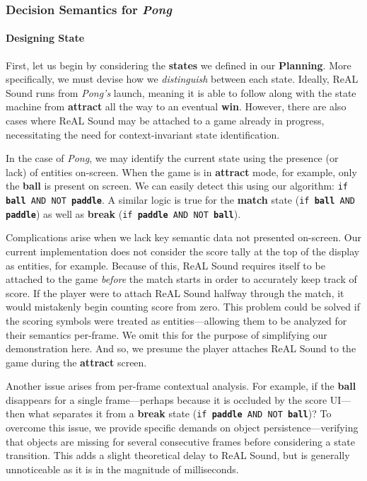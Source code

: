 \documentclass{report}
\newcommand{\rs}{ReAL Sound\xspace}
\newcommand{\plan}{\textbf{Planning}\xspace}
\newcommand{\state}[1]{\textbf{#1}}
\newcommand{\pad}{\textbf{paddle}\xspace}
\newcommand{\ball}{\textbf{ball}\xspace}
\begin{document}
\subsubsection{Decision Semantics for \emph{Pong}}
\paragraph{Designing State}

First, let us begin by considering the \state{states} we defined in our \plan. More specifically, we must devise how we \emph{distinguish} between each state. Ideally, \rs runs from \emph{Pong's} launch, meaning it is able to follow along with the state machine from \state{attract} all the way to an eventual \state{win}. However, there are also cases where \rs may be attached to a game already in progress, necessitating the need for context-invariant state identification.

In the case of \emph{Pong}, we may identify the current state using the presence (or lack) of entities on-screen. When the game is in \state{attract} mode, for example, only the \ball is present on screen. We can easily detect this using our algorithm: \texttt{if \ball AND NOT \pad}. A similar logic is true for the \state{match} state (\texttt{if \ball AND \pad}) as well as \state{break} (\texttt{if \pad AND NOT \ball}). 

Complications arise when we lack key semantic data not presented on-screen. Our current implementation does not consider the score tally at the top of the display as entities, for example. Because of this, \rs requires itself to be attached to the game \emph{before} the match starts in order to accurately keep track of score. If the player were to attach \rs halfway through the match, it would mistakenly begin counting score from zero. This problem could be solved if the scoring symbols were treated as entities---allowing them to be analyzed for their semantics per-frame. We omit this for the purpose of simplifying our demonstration here. And so, we presume the player attaches \rs to the game during the \state{attract} screen. 

Another issue arises from per-frame contextual analysis. For example, if the \ball disappears for a single frame---perhaps because it is occluded by the score UI---then what separates it from a \state{break} state (\texttt{if \pad AND NOT \ball})? To overcome this issue, we provide specific demands on object persistence---verifying that objects are missing for several consecutive frames before considering a state transition. This adds a slight theoretical delay to \rs, but is generally unnoticeable as it is in the magnitude of milliseconds.
\end{document}
